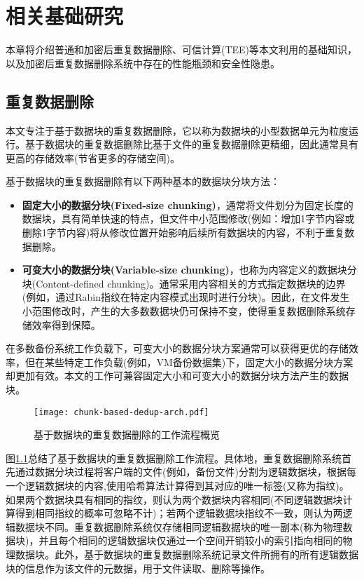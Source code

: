 \chapter{相关基础研究}
\label{chapter:background}

本章将介绍普通和加密后重复数据删除、可信计算(TEE)等本文利用的基础知识，以及加密后重复数据删除系统中存在的性能瓶颈和安全性隐患。

\section{重复数据删除}
\label{sec:background-deduplication}

本文专注于基于数据块的重复数据删除，它以称为数据块的小型数据单元为粒度运行。基于数据块的重复数据删除比基于文件的重复数据删除更精细，因此通常具有更高的存储效率(节省更多的存储空间)。

基于数据块的重复数据删除有以下两种基本的数据块分块方法：

\begin{itemize}[leftmargin=*]
    \item \textbf{固定大小的数据分块(Fixed-size chunking)}，通常将文件划分为固定长度的数据块，具有简单快速的特点，但文件中小范围修改(例如：增加1字节内容或删除1字节内容)将从修改位置开始影响后续所有数据块的内容，不利于重复数据删除。
    \item \textbf{可变大小的数据分块(Variable-size chunking)}，也称为内容定义的数据块分块(Content-defined chunking)。通常采用内容相关的方式指定数据块的边界(例如，通过Rabin指纹\cite{rabin1981fingerprinting}在特定内容模式出现时进行分块)。因此，在文件发生小范围修改时，产生的大多数数据块仍可保持不变，使得重复数据删除系统存储效率得到保障。
\end{itemize}

在多数备份系统工作负载\cite{zhu2008avoiding,lillibridge2009sparse}下，可变大小的数据分块方案通常可以获得更优的存储效率，但在某些特定工作负载(例如，VM备份数据集\cite{jin2009effectiveness})下，固定大小的数据分块方案却更加有效。本文的工作可兼容固定大小和可变大小的数据分块方法产生的数据块。

\begin{figure}[!htb]
    \small
    \centering
    \texttt{[image: chunk-based-dedup-arch.pdf]}
    \caption{基于数据块的重复数据删除的工作流程概览} 
    \label{fig:chunk-based-dedup-flow}
\end{figure}

图\ref{fig:chunk-based-dedup-flow}总结了基于数据块的重复数据删除工作流程。具体地，重复数据删除系统首先通过数据分块过程将客户端的文件(例如，备份文件)分割为逻辑数据块，根据每一个逻辑数据块的内容,使用哈希算法计算得到其对应的唯一标签(又称为指纹)。如果两个数据块具有相同的指纹，则认为两个数据块内容相同(不同逻辑数据块计算得到相同指纹的概率可忽略不计\cite{black2006compare})；若两个逻辑数据块指纹不一致，则认为两逻辑数据块不同。重复数据删除系统仅存储相同逻辑数据块的唯一副本(称为物理数据块)，并且每个相同的逻辑数据块仅通过一个空间开销较小的索引指向相同的物理数据块。此外，基于数据块的重复数据删除系统记录文件所拥有的所有逻辑数据块的信息作为该文件的元数据，用于文件读取、删除等操作。

